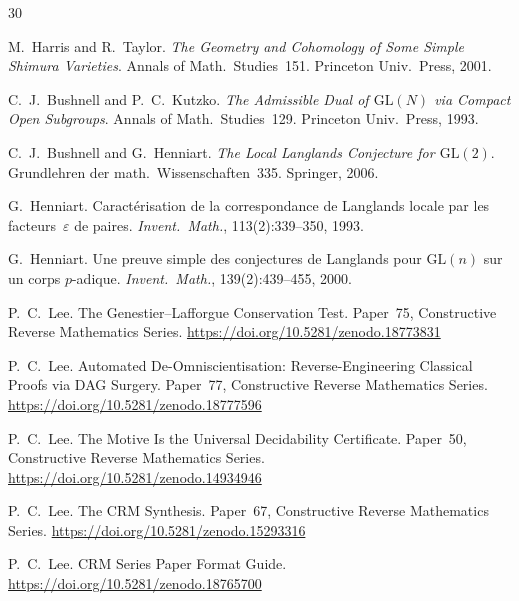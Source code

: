 \documentclass[11pt]{article}
\theoremstyle{plain}
\theoremstyle{definition}
\theoremstyle{remark}
\newcommand{\GL}{\mathrm{GL}}
\begin{document}
\begin{thebibliography}{30}

M.~Harris and R.~Taylor.
\newblock \emph{The Geometry and Cohomology of Some Simple
  Shimura Varieties}.
\newblock Annals of Math.\ Studies~151.
\newblock Princeton Univ.\ Press, 2001.

C.~J.~Bushnell and P.~C.~Kutzko.
\newblock \emph{The Admissible Dual of $\GL(N)$ via Compact
  Open Subgroups}.
\newblock Annals of Math.\ Studies~129.
\newblock Princeton Univ.\ Press, 1993.

C.~J.~Bushnell and G.~Henniart.
\newblock \emph{The Local Langlands Conjecture for $\GL(2)$}.
\newblock Grundlehren der math.\ Wissenschaften~335.
\newblock Springer, 2006.

G.~Henniart.
\newblock Caract\'erisation de la correspondance de Langlands
  locale par les facteurs~$\varepsilon$ de paires.
\newblock \emph{Invent.\ Math.}, 113(2):339--350, 1993.

G.~Henniart.
\newblock Une preuve simple des conjectures de Langlands pour
  $\GL(n)$ sur un corps $p$-adique.
\newblock \emph{Invent.\ Math.}, 139(2):439--455, 2000.

P.~C.~Lee.
\newblock The Genestier--Lafforgue Conservation Test.
\newblock Paper~75, Constructive Reverse Mathematics Series.
\newblock \url{https://doi.org/10.5281/zenodo.18773831}

P.~C.~Lee.
\newblock Automated De-Omniscientisation:
  Reverse-Engineering Classical Proofs via DAG Surgery.
\newblock Paper~77, Constructive Reverse Mathematics Series.
\newblock \url{https://doi.org/10.5281/zenodo.18777596}

P.~C.~Lee.
\newblock The Motive Is the Universal Decidability Certificate.
\newblock Paper~50, Constructive Reverse Mathematics Series.
\newblock \url{https://doi.org/10.5281/zenodo.14934946}

P.~C.~Lee.
\newblock The CRM Synthesis.
\newblock Paper~67, Constructive Reverse Mathematics Series.
\newblock \url{https://doi.org/10.5281/zenodo.15293316}

P.~C.~Lee.
\newblock CRM Series Paper Format Guide.
\newblock \url{https://doi.org/10.5281/zenodo.18765700}


\end{thebibliography}
\end{document}
